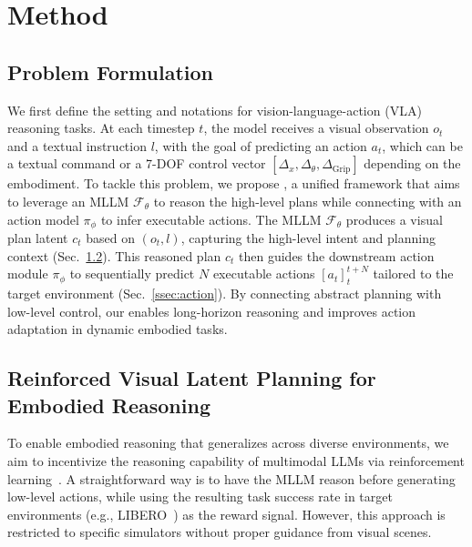 \section{Method}
\label{sec:method}


\subsection{Problem Formulation}

We first define the setting and notations for vision-language-action (VLA) reasoning tasks. At each timestep $t$, the model receives a visual observation $o_t$ and a textual instruction $l$, with the goal of predicting an action $a_t$, which can be a textual command or a 7-DOF control vector $\left[ \Delta_x, \Delta_\theta, \Delta_\text{Grip} \right]$ depending on the embodiment.
To tackle this problem, we propose \textit{\ours{}}, a unified framework that aims to leverage an MLLM $\mathcal{F}_\theta$ to reason the high-level plans while connecting with an action model $\pi_\phi$ to infer executable actions. The MLLM $\mathcal{F}_\theta$ produces a visual plan latent $c_t$ based on $(o_t, l)$, capturing the high-level intent and planning context (Sec.~\ref{ssec:ER}). This reasoned plan $c_t$ then guides the downstream action module $\pi_\phi$ to sequentially predict $N$ executable actions $[a_t]_{t}^{t+N}$ tailored to the target environment (Sec.~\ref{ssec:action}). By connecting abstract planning with low-level control, our \ours{} enables long-horizon reasoning and improves action adaptation in dynamic embodied tasks.



\subsection{Reinforced Visual Latent Planning for Embodied Reasoning}
\label{ssec:ER}





To enable embodied reasoning that generalizes across diverse environments, we aim to incentivize the reasoning capability of multimodal LLMs via reinforcement learning~\cite{shao2024deepseekmath,guo2025deepseek}. A straightforward way is to have the MLLM reason before generating low-level actions, while using the resulting task success rate in target environments (e.g., LIBERO~\cite{liu2023libero}) as the reward signal. However, this approach is restricted to specific simulators without proper guidance from visual scenes.

